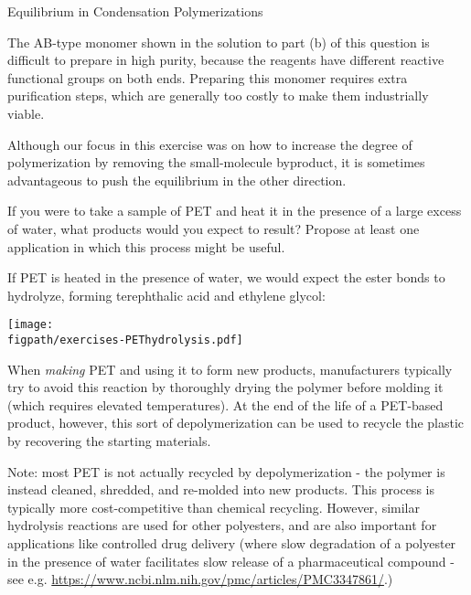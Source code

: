 \begin{activity}{Equilibrium in Condensation Polymerizations}
\begin{exercises}
\begin{enumerate}
				\begin{solution}{}
					The AB-type monomer shown in the solution to part (b) of this question is difficult to prepare in high purity, because the reagents have different reactive functional groups on both ends.  Preparing this monomer requires extra purification steps, which are generally too costly to make them industrially viable.
					
				\end{solution}
			
			\end{enumerate}
		
		\exercise Although our focus in this exercise was on how to increase the degree of polymerization by removing the small-molecule byproduct, it is sometimes advantageous to push the equilibrium in the other direction.
		
			If you were to take a sample of PET and heat it in the presence of a large excess of water, what products would you expect to result?  Propose at least one application in which this process might be useful.
		
			\begin{solution}{}
				If PET is heated in the presence of water, we would expect the ester bonds to hydrolyze, forming terephthalic acid and ethylene glycol:
		
		\centerline{\texttt{[image: \\figpath/exercises-PEThydrolysis.pdf]}}
				
				When \emph{making} PET and using it to form new products, manufacturers typically try to avoid this reaction by thoroughly drying the polymer before molding it (which requires elevated temperatures). At the end of the life of a PET-based product, however, this sort of depolymerization can be used to recycle the plastic by recovering the starting materials.
				
				Note: most PET is not actually recycled by depolymerization - the polymer is instead cleaned, shredded, and re-molded into new products.  This process is typically more cost-competitive than chemical recycling.  However, similar hydrolysis reactions are used for other polyesters, and are also important for applications like controlled drug delivery (where slow degradation of a polyester in the presence of water facilitates slow release of a pharmaceutical compound - see e.g. \url{https://www.ncbi.nlm.nih.gov/pmc/articles/PMC3347861/}.)
				
			\end{solution}
			

\end{exercises}
\end{activity}

